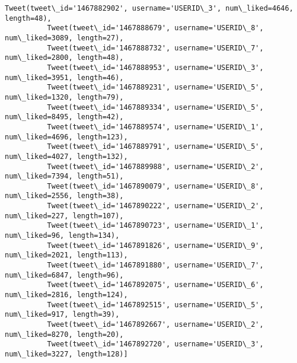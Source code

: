 \documentclass[11pt]{article}
\begin{document}
\begin{Verbatim}[commandchars=\\\{\}]
          Tweet(tweet\_id='1467882902', username='USERID\_3', num\_liked=4646, length=48),
          Tweet(tweet\_id='1467888679', username='USERID\_8', num\_liked=3089, length=27),
          Tweet(tweet\_id='1467888732', username='USERID\_7', num\_liked=2800, length=48),
          Tweet(tweet\_id='1467888953', username='USERID\_3', num\_liked=3951, length=46),
          Tweet(tweet\_id='1467889231', username='USERID\_5', num\_liked=1320, length=79),
          Tweet(tweet\_id='1467889334', username='USERID\_5', num\_liked=8495, length=42),
          Tweet(tweet\_id='1467889574', username='USERID\_1', num\_liked=4696, length=123),
          Tweet(tweet\_id='1467889791', username='USERID\_5', num\_liked=4027, length=132),
          Tweet(tweet\_id='1467889988', username='USERID\_2', num\_liked=7394, length=51),
          Tweet(tweet\_id='1467890079', username='USERID\_8', num\_liked=2556, length=38),
          Tweet(tweet\_id='1467890222', username='USERID\_2', num\_liked=227, length=107),
          Tweet(tweet\_id='1467890723', username='USERID\_1', num\_liked=96, length=134),
          Tweet(tweet\_id='1467891826', username='USERID\_9', num\_liked=2021, length=113),
          Tweet(tweet\_id='1467891880', username='USERID\_7', num\_liked=6847, length=96),
          Tweet(tweet\_id='1467892075', username='USERID\_6', num\_liked=2816, length=124),
          Tweet(tweet\_id='1467892515', username='USERID\_5', num\_liked=917, length=39),
          Tweet(tweet\_id='1467892667', username='USERID\_2', num\_liked=8270, length=20),
          Tweet(tweet\_id='1467892720', username='USERID\_3', num\_liked=3227, length=128)]
\end{Verbatim}
            
\end{document}
